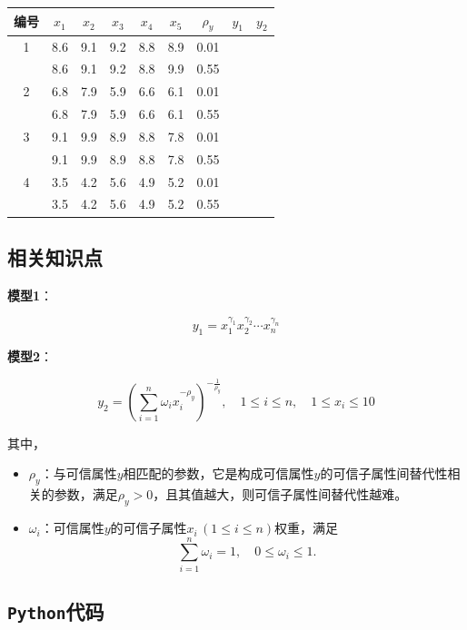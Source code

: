 \documentclass{article}
\begin{document}
\begin{center}
	\begin{tabular}{|c|c|c|c|c|c|c|c|c|}
		\hline
		编号 & $x_1$ & $x_2$ & $x_3$ & $x_4$ & $x_5$ & $\rho_y$ & $y_1$ & $y_2$ \\ \hline
		1   & 8.6   & 9.1   & 9.2   & 8.8   & 8.9   & 0.01     &       &       \\ \cline{2-9}
		& 8.6   & 9.1   & 9.2   & 8.8   & 9.9   & 0.55     &       &       \\ \hline
		2   & 6.8   & 7.9   & 5.9   & 6.6   & 6.1   & 0.01     &       &       \\ \cline{2-9}
		& 6.8   & 7.9   & 5.9   & 6.6   & 6.1   & 0.55     &       &       \\ \hline
		3   & 9.1   & 9.9   & 8.9   & 8.8   & 7.8   & 0.01     &       &       \\ \cline{2-9}
		& 9.1   & 9.9   & 8.9   & 8.8   & 7.8   & 0.55     &       &       \\ \hline
		4   & 3.5   & 4.2   & 5.6   & 4.9   & 5.2   & 0.01     &       &       \\ \cline{2-9}
		& 3.5   & 4.2   & 5.6   & 4.9   & 5.2   & 0.55     &       &       \\ \hline
	\end{tabular}
\end{center}

\subsection{相关知识点}

\textbf{模型1}：

$$
y_1 = x_1^{\gamma_1} x_2^{\gamma_2} \cdots x_n^{\gamma_n}
$$

\textbf{模型2}：

$$
y_2 = \left( \sum_{i=1}^n \omega_i x_i^{-\rho_y} \right)^{-\frac{1}{\rho_y}}, \quad 1 \leq i \leq n, \quad 1 \leq x_i \leq 10
$$

其中，
\begin{itemize}
	\item $\rho_y$：与可信属性$y$相匹配的参数，它是构成可信属性$y$的可信子属性间替代性相关的参数，满足$\rho_y > 0$，且其值越大，则可信子属性间替代性越难。
	\item $\omega_i$：可信属性$y$的可信子属性$x_i \, (1 \leq i \leq n)$权重，满足 
	$$
	\sum_{i=1}^n \omega_i = 1, \quad 0 \leq \omega_i \leq 1.
	$$
\end{itemize}

\subsection{\texttt{Python}代码}
\end{document}
